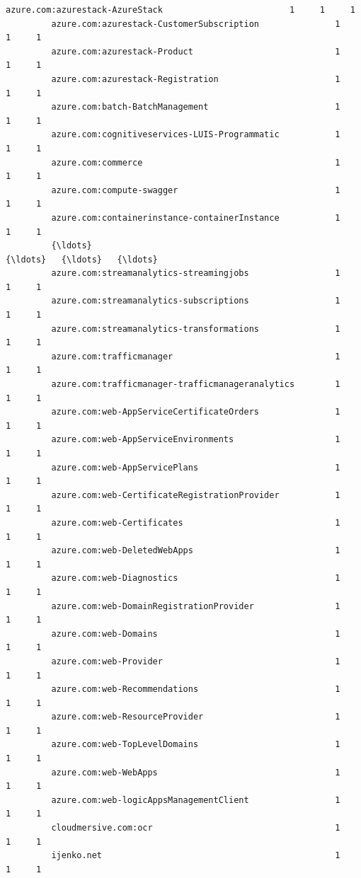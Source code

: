 \documentclass[11pt]{article}
\begin{document}
\begin{Verbatim}[commandchars=\\\{\}]
         azure.com:azurestack-AzureStack                         1     1     1   
         azure.com:azurestack-CustomerSubscription               1     1     1   
         azure.com:azurestack-Product                            1     1     1   
         azure.com:azurestack-Registration                       1     1     1   
         azure.com:batch-BatchManagement                         1     1     1   
         azure.com:cognitiveservices-LUIS-Programmatic           1     1     1   
         azure.com:commerce                                      1     1     1   
         azure.com:compute-swagger                               1     1     1   
         azure.com:containerinstance-containerInstance           1     1     1   
         {\ldots}                                                   {\ldots}   {\ldots}   {\ldots}   
         azure.com:streamanalytics-streamingjobs                 1     1     1   
         azure.com:streamanalytics-subscriptions                 1     1     1   
         azure.com:streamanalytics-transformations               1     1     1   
         azure.com:trafficmanager                                1     1     1   
         azure.com:trafficmanager-trafficmanageranalytics        1     1     1   
         azure.com:web-AppServiceCertificateOrders               1     1     1   
         azure.com:web-AppServiceEnvironments                    1     1     1   
         azure.com:web-AppServicePlans                           1     1     1   
         azure.com:web-CertificateRegistrationProvider           1     1     1   
         azure.com:web-Certificates                              1     1     1   
         azure.com:web-DeletedWebApps                            1     1     1   
         azure.com:web-Diagnostics                               1     1     1   
         azure.com:web-DomainRegistrationProvider                1     1     1   
         azure.com:web-Domains                                   1     1     1   
         azure.com:web-Provider                                  1     1     1   
         azure.com:web-Recommendations                           1     1     1   
         azure.com:web-ResourceProvider                          1     1     1   
         azure.com:web-TopLevelDomains                           1     1     1   
         azure.com:web-WebApps                                   1     1     1   
         azure.com:web-logicAppsManagementClient                 1     1     1   
         cloudmersive.com:ocr                                    1     1     1   
         ijenko.net                                              1     1     1   

\end{Verbatim}
\end{document}
